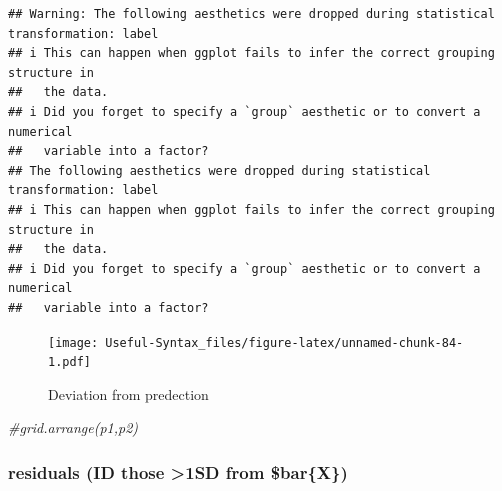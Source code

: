 \documentclass[
]{article}
\newenvironment{Shaded}{\begin{snugshade}}{\end{snugshade}}
\newcommand{\CommentTok}[1]{\textcolor[rgb]{0.56,0.35,0.01}{\textit{#1}}}
\begin{document}
\begin{verbatim}
## Warning: The following aesthetics were dropped during statistical transformation: label
## i This can happen when ggplot fails to infer the correct grouping structure in
##   the data.
## i Did you forget to specify a `group` aesthetic or to convert a numerical
##   variable into a factor?
## The following aesthetics were dropped during statistical transformation: label
## i This can happen when ggplot fails to infer the correct grouping structure in
##   the data.
## i Did you forget to specify a `group` aesthetic or to convert a numerical
##   variable into a factor?
\end{verbatim}

\begin{figure}
\centering
\texttt{[image: Useful-Syntax\_files/figure-latex/unnamed-chunk-84-1.pdf]}
\caption{\label{fig:unnamed-chunk-84}Deviation from predection}
\end{figure}

\begin{Shaded}
\begin{Highlighting}[]
\CommentTok{\#grid.arrange(p1,p2)}
\end{Highlighting}
\end{Shaded}

\hypertarget{residuals-id-those-1sd-from-barx}{%
\subsubsection{residuals (ID those \textgreater1SD from \$bar\{X\})}\label{residuals-id-those-1sd-from-barx}}
\end{document}

